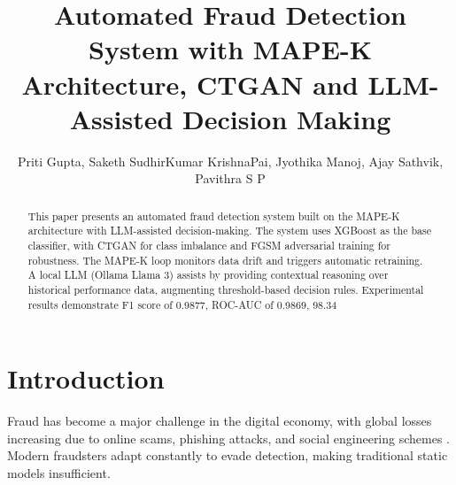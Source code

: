 \documentclass{svproc}
\begin{document}
\mainmatter

\title{Automated Fraud Detection System with MAPE-K Architecture, CTGAN and LLM-Assisted Decision Making}


\author{Priti Gupta, Saketh SudhirKumar KrishnaPai, Jyothika Manoj, Ajay Sathvik, Pavithra S P}



\maketitle

\begin{abstract}
This paper presents an automated fraud detection system built on the MAPE-K architecture with LLM-assisted decision-making. The system uses XGBoost as the base classifier, with CTGAN for class imbalance and FGSM adversarial training for robustness. The MAPE-K loop monitors data drift and triggers automatic retraining. A local LLM (Ollama Llama 3) assists by providing contextual reasoning over historical performance data, augmenting threshold-based decision rules. Experimental results demonstrate F1 score of 0.9877, ROC-AUC of 0.9869, 98.34%

\end{abstract}

\section{Introduction}\label{sec:intro}

Fraud has become a major challenge in the digital economy, with global losses increasing due to online scams, phishing attacks, and social engineering schemes \cite{acfe2022report, javelin2023fraud}. Modern fraudsters adapt constantly to evade detection, making traditional static models insufficient.
\end{document}
